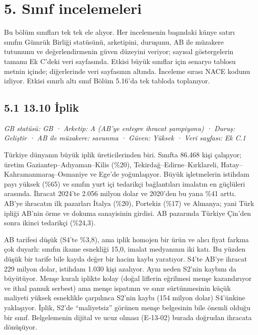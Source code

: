 \hypertarget{nace_kartlar_13-15-5-sux131nux131f-incelemeleri}{%
\section{5. Sınıf incelemeleri}\label{nace_kartlar_13-15-5-sux131nux131f-incelemeleri}}

Bu bölüm sınıfları tek tek ele alıyor. Her incelemenin başındaki künye satırı sınıfın Gümrük Birliği statüsünü, arketipini, duruşunu, AB ile müzakere tutumunu ve değerlendirmenin güven düzeyini veriyor; sayısal göstergelerin tamamı Ek C'deki veri sayfasında. Etkisi büyük sınıflar için senaryo tablosu metnin içinde; diğerlerinde veri sayfasının altında. İnceleme sırası NACE kodunu izliyor. Etkisi sınırlı altı sınıf Bölüm 5.16'da tek tabloda toplanıyor.

\hypertarget{nace_kartlar_13-15-51-1310-iux307plik}{%
\subsection{5.1 13.10 İplik}\label{nace_kartlar_13-15-51-1310-iux307plik}}

\emph{GB statüsü: GB · Arketip: A (AB'ye entegre ihracat şampiyonu) · Duruş: Geliştir · AB ile müzakere: savunma · Güven: Yüksek · Veri sayfası: Ek C.1}

Türkiye dünyanın büyük iplik üreticilerinden biri. Sınıfta 86.468 kişi çalışıyor; üretim Gaziantep--Adıyaman--Kilis (\%20), Tekirdağ--Edirne--Kırklareli, Hatay--Kahramanmaraş--Osmaniye ve Ege'de yoğunlaşıyor. Büyük işletmelerin istihdam payı yüksek (\%65) ve sınıfın yurt içi tedarikçi bağlantıları imalatın en güçlüleri arasında. İhracat 2024'te 2.056 milyon dolar ve 2020'den bu yana \%41 arttı. AB'ye ihracatın ilk pazarları İtalya (\%20), Portekiz (\%17) ve Almanya; yani Türk ipliği AB'nin örme ve dokuma sanayisinin girdisi. AB pazarında Türkiye Çin'den sonra ikinci tedarikçi (\%24,3).

AB tarifesi düşük (S4'te \%3,8), ama iplik homojen bir ürün ve alıcı fiyat farkına çok duyarlı: sınıfın ikame esnekliği 15,0, imalat medyanının iki katı. Bu yüzden düşük bir tarife bile kayda değer bir hacim kaybı yaratıyor. S4'te AB'ye ihracat 229 milyon dolar, istihdam 1.030 kişi azalıyor. Aynı neden S2'nin kaybını da büyütüyor. Menşe kuralı iplikte kolay (doğal liflerin eğrilmesi menşe kazandırıyor ve ithal pamuk serbest) ama menşe ispatının ve sınır sürtünmesinin küçük maliyeti yüksek esneklikle çarpılınca S2'nin kaybı (154 milyon dolar) S4'ünkine yaklaşıyor. İplik, S2'de ``maliyetsiz'' görünen menşe belgesinin bile önemli olduğu bir sınıf. Belgelemenin dijital ve ucuz olması (E-13-02) burada doğrudan ihracata dönüşüyor.

